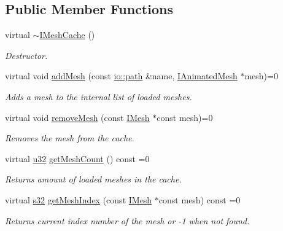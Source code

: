 \subsection*{Public Member Functions}
\begin{DoxyCompactItemize}
\item 
\mbox{\label{classirr_1_1scene_1_1IMeshCache_a6d1bfbd0bda8a559d85cfd6735bc0667}} 
virtual \hyperlink{classirr_1_1scene_1_1IMeshCache_a6d1bfbd0bda8a559d85cfd6735bc0667}{$\sim$\+I\+Mesh\+Cache} ()
\begin{DoxyCompactList}\small\item\em Destructor. \end{DoxyCompactList}\item 
virtual void \hyperlink{classirr_1_1scene_1_1IMeshCache_a2959812a3a393817b1db42761766c49b}{add\+Mesh} (const \hyperlink{namespaceirr_1_1io_a6468281622ce3a1c46b72e19f32dded5}{io\+::path} \&name, \hyperlink{classirr_1_1scene_1_1IAnimatedMesh}{I\+Animated\+Mesh} $\ast$mesh)=0
\begin{DoxyCompactList}\small\item\em Adds a mesh to the internal list of loaded meshes. \end{DoxyCompactList}\item 
virtual void \hyperlink{classirr_1_1scene_1_1IMeshCache_aa82078b06fdcaa332b44a59e4027f921}{remove\+Mesh} (const \hyperlink{classirr_1_1scene_1_1IMesh}{I\+Mesh} $\ast$const mesh)=0
\begin{DoxyCompactList}\small\item\em Removes the mesh from the cache. \end{DoxyCompactList}\item 
virtual \hyperlink{namespaceirr_a0416a53257075833e7002efd0a18e804}{u32} \hyperlink{classirr_1_1scene_1_1IMeshCache_a9dc99e46309a6ef494ef7672c9b49853}{get\+Mesh\+Count} () const =0
\begin{DoxyCompactList}\small\item\em Returns amount of loaded meshes in the cache. \end{DoxyCompactList}\item 
virtual \hyperlink{namespaceirr_ac66849b7a6ed16e30ebede579f9b47c6}{s32} \hyperlink{classirr_1_1scene_1_1IMeshCache_a2b3512bd3ff11d0b290fa5d2d580eb54}{get\+Mesh\+Index} (const \hyperlink{classirr_1_1scene_1_1IMesh}{I\+Mesh} $\ast$const mesh) const =0
\begin{DoxyCompactList}\small\item\em Returns current index number of the mesh or -\/1 when not found. \end{DoxyCompactList}\item 

\end{DoxyCompactItemize}
